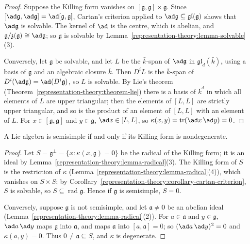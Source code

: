 \begin{proof}
Suppose the Killing form vanishes on $[\mathfrak{g}, \mathfrak{g}] \times \mathfrak{g}$. Since $[\ad\mathfrak{g}, \ad\mathfrak{g}] = \ad[\mathfrak{g}, \mathfrak{g}]$, Cartan's
criterion applied to $\ad\mathfrak{g} \subseteq \mathfrak{gl}(\mathfrak{g})$ shows that $\ad\mathfrak{g}$ is solvable. The kernel of $\ad$ is the centre, which is abelian, and
$\mathfrak{g}/\mathfrak{z}(\mathfrak{g}) \cong \ad\mathfrak{g}$; so $\mathfrak{g}$ is solvable by Lemma~\ref{representation-theory:lemma-solvable}(3).

Conversely, let $\mathfrak{g}$ be solvable, and let $L$ be the $\bar k$-span of $\ad\mathfrak{g}$ in $\mathfrak{gl}_d(\bar k)$, using a basis of $\mathfrak{g}$ and an algebraic closure
$\bar k$. Then $D^iL$ is the $\bar k$-span of $D^i(\ad\mathfrak{g}) = \ad(D^i\mathfrak{g})$, so $L$ is solvable. By Lie's theorem
(Theorem~\ref{representation-theory:theorem-lie}) there is a basis of $\bar k^d$ in which all elements of $L$ are upper triangular; then the elements of $[L, L]$ are strictly
upper triangular, and so is the product of an element of $[L, L]$ with an element of $L$. For $x \in [\mathfrak{g}, \mathfrak{g}]$ and $y \in \mathfrak{g}$,
$\ad x \in [L, L]$, so $\kappa(x, y) = \operatorname{tr}(\ad x\,\ad y) = 0$.
\end{proof}

\begin{theorem}\label{representation-theory:theorem-killing-criterion}
A Lie algebra is semisimple if and only if its Killing form is nondegenerate.
\end{theorem}

\begin{proof}
Let $S = \mathfrak{g}^\perp = \{x : \kappa(x, \mathfrak{g}) = 0\}$ be the radical of the Killing form; it is an ideal by Lemma~\ref{representation-theory:lemma-radical}(3). The
Killing form of $S$ is the restriction of $\kappa$ (Lemma~\ref{representation-theory:lemma-radical}(4)), which vanishes on $S \times S$; by
Corollary~\ref{representation-theory:corollary-cartan-criterion}, $S$ is solvable, so $S \subseteq \operatorname{rad}\mathfrak{g}$. Hence if $\mathfrak{g}$ is semisimple, $S = 0$.

Conversely, suppose $\mathfrak{g}$ is not semisimple, and let $\mathfrak{a} \neq 0$ be an abelian ideal (Lemma~\ref{representation-theory:lemma-radical}(2)). For $a \in \mathfrak{a}$
and $y \in \mathfrak{g}$, $\ad a\,\ad y$ maps $\mathfrak{g}$ into $\mathfrak{a}$, and maps $\mathfrak{a}$ into $[a, \mathfrak{a}] = 0$; so $(\ad a\,\ad y)^2 = 0$ and
$\kappa(a, y) = 0$. Thus $0 \neq \mathfrak{a} \subseteq S$, and $\kappa$ is degenerate.
\end{proof}

